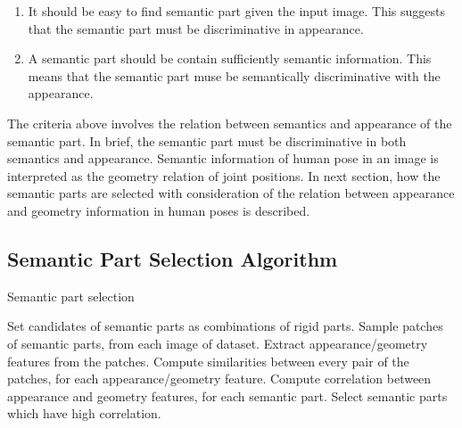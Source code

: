 \documentclass[master,english,final]{postech-ucs}
\begin{document}
\begin{enumerate}[noitemsep]
    \item It should be easy to find semantic part given the input image. This suggests that the semantic part must be discriminative in appearance.
    \item A semantic part should be contain sufficiently semantic information. This means that the semantic part muse be semantically discriminative with the appearance.
\end{enumerate}

The criteria above involves the relation between semantics and appearance of the semantic part. In brief, the semantic part must be discriminative in both semantics and appearance. Semantic information of human pose in an image is interpreted as the geometry relation of joint positions. In next section, how the semantic parts are selected with consideration of the relation between appearance and geometry information in human poses is described.


\newpage

\subsection{Semantic Part Selection Algorithm }
\label{sec:semanticPart_algorithm}

\begin{algorithm}
\caption{Semantic part selection}
\label{algo:semanticPart}
\begin{algorithmic}[1]
\State Set candidates of semantic parts as combinations of rigid parts.
\State Sample patches of semantic parts, from each image of dataset.
\State Extract appearance/geometry features from the patches.
\State Compute similarities between every pair of the patches, for each appearance/geometry feature.
\State Compute correlation between appearance and geometry features, for each semantic part.
\State Select semantic parts which have high correlation.
\end{algorithmic}
\end{algorithm}
\end{document}
